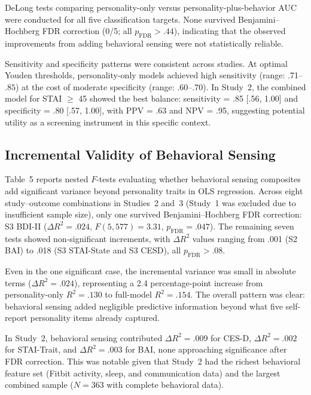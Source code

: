 \documentclass[12pt, a4paper]{article}
\begin{document}
DeLong tests comparing personality-only versus personality-plus-behavior AUC were conducted for all five classification targets. None survived Benjamini--Hochberg FDR correction (0/5; all $p_{\text{FDR}} > .44$), indicating that the observed improvements from adding behavioral sensing were not statistically reliable.

Sensitivity and specificity patterns were consistent across studies. At optimal Youden thresholds, personality-only models achieved high sensitivity (range: .71--$.85$) at the cost of moderate specificity (range: .60--$.70$). In Study~2, the combined model for STAI $\geq$ 45 showed the best balance: sensitivity = .85 [.56, 1.00] and specificity = .80 [.57, 1.00], with PPV = .63 and NPV = .95, suggesting potential utility as a screening instrument in this specific context.

\subsection{Incremental Validity of Behavioral Sensing}

Table~5 reports nested $F$-tests evaluating whether behavioral sensing composites add significant variance beyond personality traits in OLS regression. Across eight study--outcome combinations in Studies~2 and~3 (Study~1 was excluded due to insufficient sample size), only one survived Benjamini--Hochberg FDR correction: S3 BDI-II ($\Delta R^2 = .024$, $F(5, 577) = 3.31$, $p_{\text{FDR}} = .047$). The remaining seven tests showed non-significant increments, with $\Delta R^2$ values ranging from .001 (S2 BAI) to .018 (S3 STAI-State and S3 CESD), all $p_{\text{FDR}} > .08$.

Even in the one significant case, the incremental variance was small in absolute terms ($\Delta R^2 = .024$), representing a 2.4 percentage-point increase from personality-only $R^2 = .130$ to full-model $R^2 = .154$. The overall pattern was clear: behavioral sensing added negligible predictive information beyond what five self-report personality items already captured.

In Study~2, behavioral sensing contributed $\Delta R^2 = .009$ for CES-D, $\Delta R^2 = .002$ for STAI-Trait, and $\Delta R^2 = .003$ for BAI, none approaching significance after FDR correction. This was notable given that Study~2 had the richest behavioral feature set (Fitbit activity, sleep, and communication data) and the largest combined sample ($N = 363$ with complete behavioral data).
\end{document}
